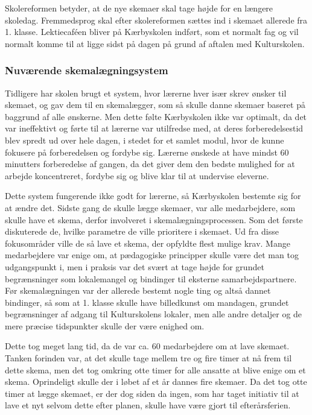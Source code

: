 Skolereformen betyder, at de nye skemaer skal tage højde for en længere skoledag. Fremmedsprog skal efter skolereformen sættes ind i skemaet allerede fra 1. klasse. Lektiecaf\'een bliver på Kærbyskolen indført, som et normalt fag og vil normalt komme til at ligge sidst på dagen på grund af aftalen med Kulturskolen\cite{kaerby_skolereform}.

\subsubsection*{Nuværende skemalægningsystem}
Tidligere har skolen brugt et system, hvor lærerne hver især skrev ønsker til skemaet, og gav dem til en skemalægger, som så skulle danne skemaer baseret på baggrund af alle ønskerne. Men dette følte Kærbyskolen ikke var optimalt, da det var ineffektivt og førte til at lærerne var utilfredse med, at deres forberedelsestid blev spredt ud over hele dagen, i stedet for et samlet modul, hvor de kunne fokusere på forberedelsen og fordybe sig\cite{interview_Kaerby}. Lærerne ønskede at have mindst 60 minutters forberedelse af gangen, da det giver dem den bedste mulighed for at arbejde koncentreret, fordybe sig og blive klar til at undervise eleverne.

Dette system fungerende ikke godt for lærerne, så Kærbyskolen bestemte sig for at ændre det. Sidste gang de skulle lægge skemaer, var alle medarbejdere, som skulle have et skema, derfor involveret i skemalægningsprocessen. Som det første diskuterede de, hvilke parametre de ville prioritere i skemaet. Ud fra disse fokusområder ville de så lave et skema, der opfyldte flest mulige krav. Mange medarbejdere var enige om, at pædagogiske principper skulle være det man tog udgangspunkt i, men i praksis var det svært at tage højde for grundet begrænsninger som lokalemangel og bindinger til eksterne samarbejdspartnere. Før skemalægningen var der allerede bestemt nogle ting og altså dannet bindinger, så som at 1. klasse skulle have billedkunst om mandagen, grundet begrænsninger af adgang til Kulturskolens lokaler, men alle andre detaljer og de mere præcise tidspunkter skulle der være enighed om. 

Dette tog meget lang tid, da de var ca. 60 medarbejdere om at lave skemaet. Tanken forinden var, at det skulle tage mellem tre og fire timer at nå frem til dette skema, men det tog omkring otte timer for alle ansatte at blive enige om et skema. Oprindeligt skulle der i løbet af et år dannes fire skemaer. Da det tog otte timer at lægge skemaet, er der dog siden da ingen, som har taget initiativ til at lave et nyt selvom dette efter planen, skulle have være gjort til efterårsferien.


